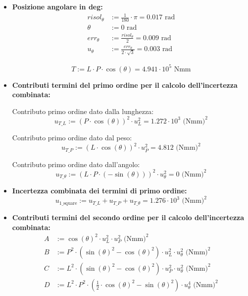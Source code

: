 \documentclass[a4paper, twoside]{article}
\begin{document}
\begin{itemize}
\item{
\noindent
\textbf{Posizione angolare in deg:}
\begin{align}
risol_{\theta} &:= \frac{1}{180} \cdot \pi = 0.017 \text{ rad} \\
\theta &:= 0 \text{ rad} \\
err_{\theta} &:= \frac{risol_{\theta}}{2} = 0.009 \text{ rad} \\
u_{\theta} &:= \frac{err_{\theta}}{2 \cdot \sqrt{3}} = 0.003 \text{ rad}
\end{align}

\begin{equation}
T := L \cdot P \cdot \cos(\theta) = 4.941 \cdot 10^{5} \text{ Nmm}
\end{equation}
}

\item{
\vspace{0.5cm}
\noindent
\textbf{Contributi termini del primo ordine per il calcolo dell'incertezza combinata:}

Contributo primo ordine dato dalla lunghezza:
\begin{equation}
u_{T\_L} := (P \cdot \cos(\theta))^{2} \cdot u_{L}^{2} = 1.272 \cdot 10^{3} \text{ (Nmm)}^{2}
\end{equation}

Contributo primo ordine dato dal peso:
\begin{equation}
u_{T\_P} := (L \cdot \cos(\theta))^{2} \cdot u_{P}^{2} = 4.812 \text{ (Nmm)}^{2}
\end{equation}

Contributo primo ordine dato dall'angolo:
\begin{equation}
u_{T\_\theta} := (L \cdot P \cdot (-\sin(\theta)))^{2} \cdot u_{\theta}^{2} = 0 \text{ (Nmm)}^{2}
\end{equation}
}

\item{
\textbf{Incertezza combinata dei termini di primo ordine:}
\begin{equation}
u_{1\_\text{square}} := u_{T\_L} + u_{T\_P} + u_{T\_\theta} = 1.276 \cdot 10^{3} \text{ (Nmm)}^{2}
\end{equation}
}

\item{
\vspace{0.5cm}
\noindent
\textbf{Contributi termini del secondo ordine per il calcolo dell'incertezza combinata:}
\begin{align}
A &:= \cos(\theta)^{2} \cdot u_{L}^{2} \cdot u_{P}^{2} \text{ (Nmm)}^{2} \\
B &:= P^{2} \cdot (\sin(\theta)^{2} - \cos(\theta)^{2}) \cdot u_{L}^{2} \cdot u_{\theta}^{2} \text{ (Nmm)}^{2} \\
C &:= L^{2} \cdot (\sin(\theta)^{2} - \cos(\theta)^{2}) \cdot u_{P}^{2} \cdot u_{\theta}^{2} \text{ (Nmm)}^{2} \\
D &:= L^{2} \cdot P^{2} \cdot \left(\frac{1}{2} \cdot \cos(\theta)^{2} - \sin(\theta)^{2}\right) \cdot u_{\theta}^{4} \text{ (Nmm)}^{2}
\end{align}

}
\end{itemize}
\end{document}
